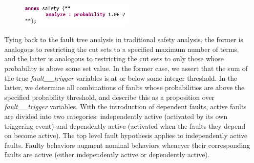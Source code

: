 \begin{figure}[h!]
	\vspace{-0.1in}
		\includegraphics[width=0.5\textwidth]{images/hypothesisProb.png}
	\vspace{-0.1in}
\end{figure}

Tying back to the fault tree analysis in traditional safety analysis, the former is analogous to restricting the cut sets to a specified maximum number of terms, and the latter is analogous to restricting the cut sets to only those whose probability is above some set value. In the former case, we assert that the sum of the true {\em fault\_\_trigger} variables is at or below some integer threshold.  In the latter, we determine all combinations of faults whose probabilities are above the specified probability threshold, and describe this as a proposition over {\em fault\_\_trigger} variables. 
%
With the introduction of dependent faults, active faults are divided into two categories: independently active (activated by its own triggering event) and dependently active (activated when the faults they depend on become active). The top level fault hypothesis applies to independently active faults. Faulty behaviors augment nominal behaviors whenever their corresponding faults are active (either independently active or dependently active).










